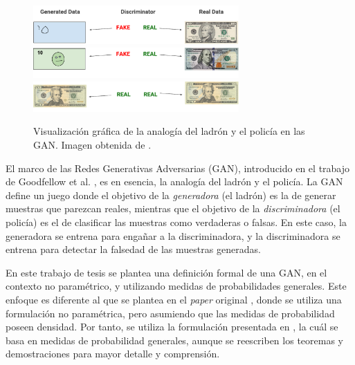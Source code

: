 {{\begin{figure}[htbp]
    \centering
    \includegraphics[width=0.7\textwidth]{img/gan/bad_gan.pdf}\vspace{0.6cm}
    \includegraphics[width=0.7\textwidth]{img/gan/ok_gan.pdf}
    \includegraphics[width=0.7\textwidth]{img/gan/good_gan.pdf}
    \caption{Visualización gráfica de la analogía del ladrón y el policía en las GAN. Imagen obtenida de \cite{googlegan}.}
    \label{fig:gan-analogy}
\end{figure}

El marco de las Redes Generativas Adversarias (GAN), introducido en el trabajo de Goodfellow et al. \cite{goodfellow2014generative}, es en esencia, la analogía del ladrón y el policía.
La GAN define un juego donde el objetivo de la \emph{generadora} (el ladrón) es la de generar muestras que parezcan reales, mientras que el objetivo de la \emph{discriminadora} (el policía) es el de clasificar las muestras como verdaderas o falsas.
En este caso, la generadora se entrena para engañar a la discriminadora, y la discriminadora se entrena para detectar la falsedad de las muestras generadas.

En este trabajo de tesis se plantea una definición formal de una GAN, en el contexto no paramétrico, y utilizando medidas de probabilidades generales. Este enfoque es diferente al que se plantea en el \textit{paper} original \cite{goodfellow2014generative}, donde se utiliza una formulación no paramétrica, pero asumiendo que las medidas de probabilidad poseen densidad. Por tanto, se utiliza la formulación presentada en \cite{wikipediagan}, la cuál se basa en medidas de probabilidad generales, aunque se reescriben los teoremas y demostraciones para mayor detalle y comprensión.

}}
